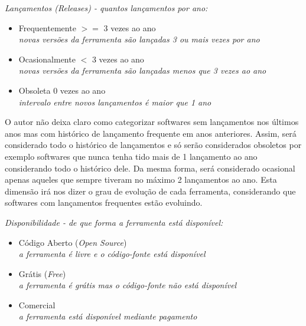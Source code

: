 \begin{description}

  \item {\it Lançamentos ({\it Releases}) - quantos lançamentos por ano:}
    \begin{itemize}
      \item Frequentemente $>=$ 3 vezes ao ano\\
        {\it \small novas versões da ferramenta são lançadas 3 ou mais vezes por ano}
      \item Ocasionalmente $<$ 3 vezes ao ano\\
        {\it \small novas versões da ferramenta são lançadas menos que 3 vezes ao ano}
      \item Obsoleta 0 vezes ao ano\\
        {\it \small intervalo entre novos lançamentos é maior que 1 ano}
    \end{itemize}

\end{description}

O autor não deixa claro como categorizar softwares sem lançamentos nos últimos
anos mas com histórico de lançamento frequente em anos anteriores. Assim, será
considerado todo o histórico de lançamentos e só serão considerados obsoletos
por exemplo softwares que nunca tenha tido mais de 1 lançamento ao ano
considerando todo o histórico dele. Da mesma forma, será considerado ocasional
apenas aqueles que sempre tiveram no máximo 2 lançamentos ao ano. Esta dimensão
irá nos dizer o grau de evolução de cada ferramenta, considerando que softwares
com lançamentos frequentes estão evoluindo.

\begin{description}

  \item {\it Disponibilidade - de que forma a ferramenta está disponível:}
    \begin{itemize}
      \item Código Aberto ({\it Open Source})\\
        {\it \small a ferramenta é livre e o código-fonte está disponível}
      \item Grátis ({\it Free})\\
        {\it \small a ferramenta é grátis mas o código-fonte não está disponível}
      \item Comercial\\
        {\it \small a ferramenta está disponível mediante pagamento}
    \end{itemize}

\end{description}

